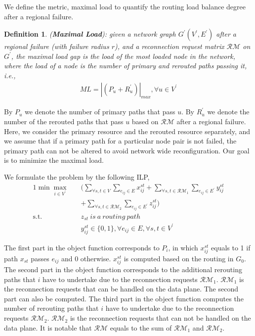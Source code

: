 \documentclass[10pt,journal]{IEEEtran}
\newtheorem{definition}{Definition}
\begin{document}
We define the metric, maximal load to quantify the routing load balance degree after a regional failure.
\begin{definition} (\textbf{Maximal Load}): given a network graph $G^{'} (V^{'}, E^{'})$ after a regional failure (with failure radius $r$), and a reconnection request matrix $\mathcal{RM}$ on $G^{'}$, the maximal load gap is the load of the most loaded node in the network, where the load of a node is the number of primary and rerouted paths passing it, i.e.,
\begin{align} \nonumber
ML = |(P_{u}+R^{'}_{u})|_{max}, \forall u \in V^{'}
\end{align}
\end{definition}
By $P_{u}$ we denote the number of primary paths that pass  $u$. By $R^{'}_{u}$ we denote the number of the rerouted paths that pass $u$ based on $\mathcal{RM}$ after a regional failure. Here, we consider the primary resource and the rerouted resource separately, and we assume that if a primary path for a particular node pair is not failed, the primary path can not be altered to avoid network wide reconfiguration. Our goal is to minimize the maximal load.

We formulate the problem by the following ILP,
\begin{alignat}{1}
\min \max_{ i \in V^{'}}\quad &\bigg(\sum_{\forall s, t \in V}\sum_{e_{ij}\in E}x^{st}_{ij} + \sum_{\forall s, t \in \mathcal{RM}_{1}}\sum_{e_{ij}\in E^{'}}y^{st}_{ij}\nonumber \\ \tag{ILP1}
\!\!\!\!\!\!\!  & + \sum_{\forall s, t \in \nonumber\mathcal{RM}_{2}}\sum_{e_{ij}\in E^{'}}z^{st}_{ij}  \bigg)\\ \nonumber
\mbox{s.t.}\quad
&z_{st}\ is\ a\ routing\ path\tag{1a}\nonumber\\
&\!\!\!\!\!\!\!\! y_{ij}^{st} \in \{0, 1\}, \forall e_{ij}\in E,\forall s, t \in V^{'} \tag{1b} \nonumber
\end{alignat}

The first part in the object function corresponds to $P_{i}$, in which $x_{ij}^{st}$ equals to 1 if path $x_{st}$ passes $e_{ij}$ and 0 otherwise. $x_{ij}^{st}$ is computed based on the routing in $G_{0}$. The second part in the object function corresponds to the additional rerouting paths that $i$ have to undertake due to the reconnection requests $\mathcal{RM}_{1}$. $\mathcal{RM}_{1}$ is the reconnection requests that can be handled on the data plane. The second part can also be computed. The third part in the object function computes the number of rerouting paths that $i$ have to undertake due to the reconnection requests $\mathcal{RM}_{2}$. $\mathcal{RM}_{2}$ is the reconnection requests that can not be handled on the data plane. It is notable that $\mathcal{RM}$ equals to the sum of $\mathcal{RM}_{1}$ and $\mathcal{RM}_{2}$.
\end{document}
